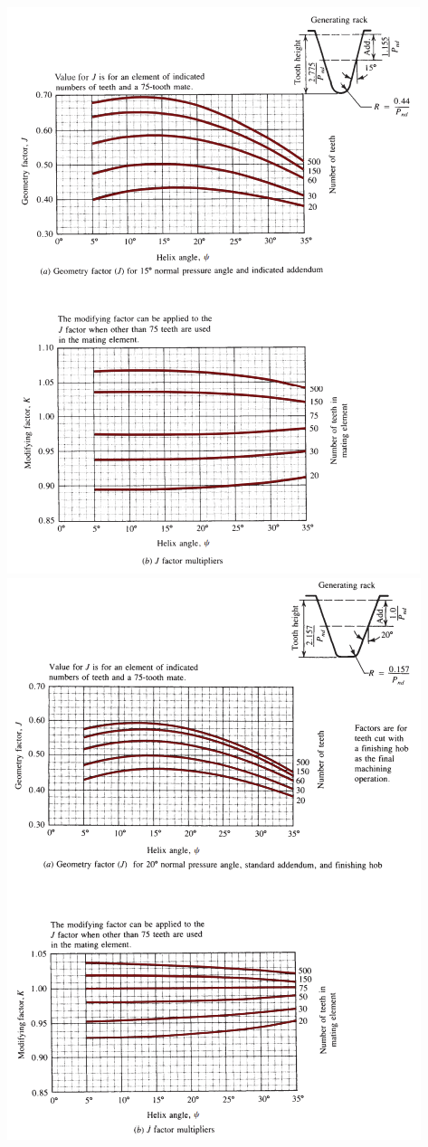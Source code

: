 \documentclass[11pt, fleqn]{article}
\begin{document}
\begin{enumerate}
    \includegraphics[scale=0.9]{Gears/Fig 10-5.png}
    \includegraphics[scale=0.9]{Gears/Fig 10-6.png}\\

\end{enumerate}
\end{document}
